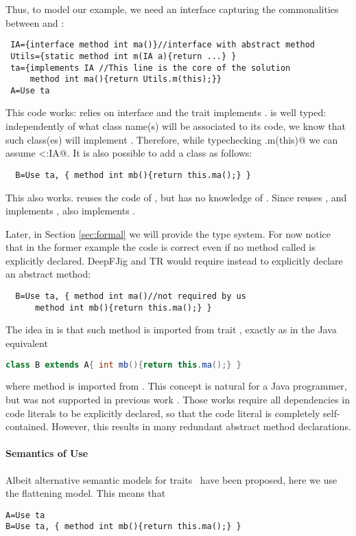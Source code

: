 Thus, to model our example, we need an interface
capturing the commonalities between \Q@A@ and \Q@B@:
\saveSpace
\begin{lstlisting}
 IA={interface method int ma()}//interface with abstract method
 Utils={static method int m(IA a){return ...} }
 ta={implements IA //This line is the core of the solution
     method int ma(){return Utils.m(this);}}
 A=Use ta
\end{lstlisting}
\saveSpace
This code works: \Q@Utils@ relies on interface \Q@IA@ and the trait \Q@ta@
implements \Q@IA@.
\Q@ta@ is well typed: independently of what class name(s) will be
associated to its code, we know that such class(es) will implement
\Q@IA@. 
Therefore, while typechecking \Q@Utils.m(this)@ we can assume
\Q@this<:IA@.
 It is also possible to add a class \Q@B@ as follows:
\saveSpace
\begin{lstlisting}
  B=Use ta, { method int mb(){return this.ma();} }
\end{lstlisting}
\saveSpace
This also works.  \Q@B@ reuses the code of \Q@ta@, but has no knowledge of \Q@A@.
Since \Q@B@ reuses \Q@ta@, and \Q@ta@ implements \Q@IA@, also \Q@B@ implements \Q@IA@. 

Later, in Section \ref{sec:formal} we will provide the type
system. 
For now notice that in the former example the code is correct even if
no method called \Q@ma@ is explicitly declared.
DeepFJig and TR would require instead to explicitly declare an abstract \Q@ma@ method:
\saveSpace
\begin{lstlisting}
  B=Use ta, { method int ma()//not required by us
      method int mb(){return this.ma();} }
\end{lstlisting}\saveSpace
\noindent
The idea in \name is that such method is imported from trait \Q@ta@, exactly as in the Java equivalent
\saveSpace\begin{lstlisting}[language=Java]
  class B extends A{ int mb(){return this.ma();} }  
\end{lstlisting}
\saveSpace
where method \Q@ma@ is imported from \Q@A@.
This concept is natural for a Java programmer, but was not supported
in previous work \cite{BETTINI2013521,deep}. Those works require all
dependencies in code literals to be explicitly declared, so that the
code literal is completely self-contained. However, this results in
many redundant abstract method declarations.

\paragraph{Semantics of Use}
Albeit alternative semantic models for traits~\cite{Traits:ECOOP2003} have been proposed,
here we use the flattening model. This means that 
\saveSpace\begin{lstlisting}
A=Use ta
B=Use ta, { method int mb(){return this.ma();} }
\end{lstlisting}\saveSpace
 
